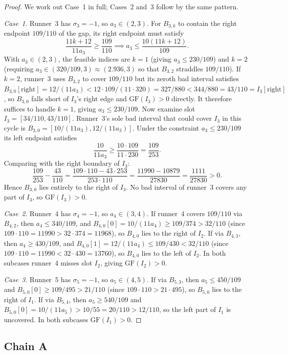 \documentclass[12pt,a4paper]{amsart}
\theoremstyle{definition}
\theoremstyle{remark}
\newcommand{\GF}{\mathrm{GF}}
\begin{document}
\begin{proof}
We work out Case~1 in full; Cases~2 and~3 follow by the same pattern.

\textit{Case~1.} Runner~3 has $\sigma_3=-1$, so $a_3\in(2,3)$. For $B_{3,k}$ to contain
the right endpoint $109/110$ of the gap, its right endpoint must satisfy
\[
  \frac{11k+12}{11a_3} \ge \frac{109}{110} \implies a_3 \le \frac{10(11k+12)}{109}.
\]
With $a_3\in(2,3)$, the feasible indices are $k=1$ (giving $a_3\le 230/109$) and $k=2$
(requiring $a_3\in(320/109,3)\approx(2.936,3)$ so that $B_{3,2}$ straddles $109/110$).
If $k=2$, runner~3 uses $B_{3,2}$ to cover $109/110$ but its zeroth bad interval satisfies
$B_{3,0}[\text{right}]=12/(11a_3)<12\cdot 109/(11\cdot 320)=327/880<344/880=43/110=I_3[\text{right}]$,
so $B_{3,0}$ falls short of $I_3$'s right edge and $\GF(I_3)>0$ directly.
It therefore suffices to handle $k=1$, giving $a_3\le 230/109$.
Now examine slot $I_3=[34/110,43/110]$. Runner~3's sole bad interval that could cover $I_3$
in this cycle is $B_{3,0}=[10/(11a_3),12/(11a_3)]$. Under the constraint $a_3\le 230/109$
its left endpoint satisfies
\[
  \frac{10}{11a_3} \ge \frac{10\cdot 109}{11\cdot 230} = \frac{109}{253}.
\]
Comparing with the right boundary of $I_3$:
\[
  \frac{109}{253} - \frac{43}{110}
  = \frac{109\cdot 110 - 43\cdot 253}{253\cdot 110}
  = \frac{11990-10879}{27830}
  = \frac{1111}{27830} > 0.
\]
Hence $B_{3,0}$ lies entirely to the right of $I_3$. No bad interval of runner~3 covers
any part of $I_3$, so $\GF(I_3)>0$.

\textit{Case~2.} Runner~4 has $\sigma_4=-1$, so $a_4\in(3,4)$. If runner~4 covers $109/110$
via $B_{4,2}$, then $a_4\le 340/109$, and $B_{4,0}[0]=10/(11a_4)\ge 109/374>32/110$
(since $109\cdot 110=11990>32\cdot 374=11968$), so $B_{4,0}$ lies to the right of $I_2$.
If via $B_{4,3}$, then $a_4\ge 430/109$, and $B_{4,0}[1]=12/(11a_4)\le 109/430<32/110$
(since $109\cdot 110=11990<32\cdot 430=13760$), so $B_{4,0}$ lies to the left of $I_2$.
In both subcases runner~4 misses slot $I_2$, giving $\GF(I_2)>0$.

\textit{Case~3.} Runner~5 has $\sigma_5=-1$, so $a_5\in(4,5)$. If via $B_{5,3}$, then
$a_5\le 450/109$ and $B_{5,0}[0]\ge 109/495>21/110$ (since $109\cdot 110>21\cdot 495$),
so $B_{5,0}$ lies to the right of $I_1$. If via $B_{5,4}$, then $a_5\ge 540/109$ and
$B_{5,0}[0]=10/(11a_5)>10/55=20/110>12/110$, so the left part of $I_1$ is uncovered.
In both subcases $\GF(I_1)>0$.
\end{proof}

\subsection{Chain A}
\end{document}
